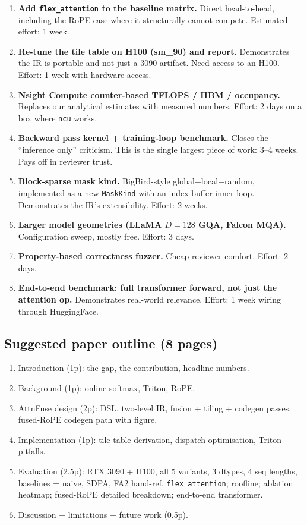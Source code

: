 \documentclass[11pt]{article}
\begin{document}
\begin{enumerate}[leftmargin=1.4em,itemsep=2pt]
  \item \textbf{Add \texttt{flex\_attention} to the baseline matrix.}
        Direct head-to-head, including the RoPE case where it
        structurally cannot compete. Estimated effort: 1 week.
  \item \textbf{Re-tune the tile table on H100 (sm\_90) and report.}
        Demonstrates the IR is portable and not just a 3090 artifact.
        Need access to an H100. Effort: 1 week with hardware access.
  \item \textbf{Nsight Compute counter-based TFLOPS / HBM / occupancy.}
        Replaces our analytical estimates with measured numbers.
        Effort: 2 days on a box where \texttt{ncu} works.
  \item \textbf{Backward pass kernel + training-loop benchmark.}
        Closes the ``inference only'' criticism. This is the single
        largest piece of work: 3--4 weeks. Pays off in reviewer trust.
  \item \textbf{Block-sparse mask kind.} BigBird-style global+local+random,
        implemented as a new \texttt{MaskKind} with an index-buffer
        inner loop. Demonstrates the IR's extensibility. Effort: 2 weeks.
  \item \textbf{Larger model geometries (LLaMA $D{=}128$ GQA, Falcon MQA).}
        Configuration sweep, mostly free. Effort: 3 days.
  \item \textbf{Property-based correctness fuzzer.} Cheap reviewer
        comfort. Effort: 2 days.
  \item \textbf{End-to-end benchmark: full transformer forward, not just
        the attention op.} Demonstrates real-world relevance. Effort:
        1 week wiring through HuggingFace.
\end{enumerate}

\subsection{Suggested paper outline (8 pages)}

\begin{enumerate}[leftmargin=1.4em,itemsep=2pt]
  \item Introduction (1p): the gap, the contribution, headline numbers.
  \item Background (1p): online softmax, Triton, RoPE.
  \item AttnFuse design (2p): DSL, two-level IR, fusion + tiling +
        codegen passes, fused-RoPE codegen path with figure.
  \item Implementation (1p): tile-table derivation, dispatch
        optimisation, Triton pitfalls.
  \item Evaluation (2.5p): RTX 3090 + H100, all 5 variants, 3 dtypes,
        4 seq lengths, baselines = naive, SDPA, FA2 hand-ref,
        \texttt{flex\_attention}; roofline; ablation heatmap;
        fused-RoPE detailed breakdown; end-to-end transformer.
  \item Discussion + limitations + future work (0.5p).
\end{enumerate}
\end{document}
